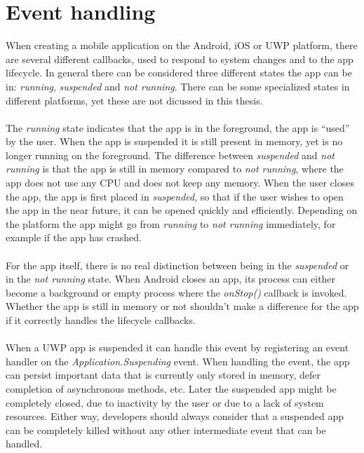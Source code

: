 \documentclass[pdftex,a4paper,12pt,twoside]{report}
\begin{document}
\section{Event handling}
When creating a mobile application on the Android, iOS or UWP platform, there are several different callbacks, used to respond to system changes and to the app lifecycle. In general there can be considered three different states the app can be in: \emph{running}, \emph{suspended} and \emph{not running}. There can be some specialized states in different platforms, yet these are not dicussed in this thesis.
\\\\
The \emph{running} state indicates that the app is in the foreground, the app is ``used'' by the user. When the app is suspended it is still present in memory, yet is no longer running on the foreground. The difference between \emph{suspended} and \emph{not running} is that the app is still in memory compared to \emph{not running}, where the app does not use any CPU and does not keep any memory. When the user closes the app, the app is first placed in \emph{suspended}, so that if the user wishes to open the app in the near future, it can be opened quickly and efficiently. Depending on the platform the app might go from \emph{running} to \emph{not running} immediately, for example if the app has crashed.
\\\\
For the app itself, there is no real distinction between being in the \emph{suspended} or in the \emph{not running} state. When Android closes an app, its process can either become a background or empty process where the \emph{onStop()} callback is invoked. Whether the app is still in memory or not shouldn't make a difference for the app if it correctly handles the lifecycle callbacks.
\\\\
When a UWP app is suspended it can handle this event by registering an event handler on the \emph{Application.Suspending} event. When handling the event, the app can persist important data that is currently only stored in memory, defer completion of asynchronous methods, etc. Later the suspended app might be completely closed, due to inactivity by the user or due to a lack of system resources. Either way, developers should always consider that a suspended app can be completely killed without any other intermediate event that can be handled.
\\\\
\end{document}
